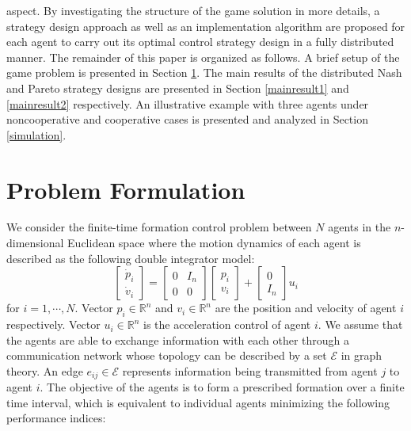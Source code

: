 \documentclass[letterpaper, 10 pt, conference,onecolumn]{ieeeconf}  %
\begin{document}
aspect. By investigating the structure of the game solution in more details, a strategy design approach as well as {an} implementation algorithm {are} proposed for each agent to carry out its optimal control strategy design in a fully distributed manner. The {remainder} of this paper is organized as follows. A brief setup of the game {problem} is presented in Section \ref{setup}. The main results of the distributed Nash and Pareto strategy {designs} are presented in Section \ref{mainresult1} and \ref{mainresult2} {respectively}. An illustrative example with three agents under noncooperative and cooperative cases is presented and analyzed in Section \ref{simulation}.


\section{Problem Formulation}\label{setup}
We consider the {finite-time} formation control problem between $N$ agents in the $n$-dimensional Euclidean space where the motion dynamics of each agent is described as the following double integrator model:
{\begin{equation}
\begin{bmatrix}
\dot{p}_i\\ \dot{v}_i
\end{bmatrix}=\begin{bmatrix}
0&I_n\\0&0
\end{bmatrix}\begin{bmatrix}
p_i\\
v_i\end{bmatrix}+\begin{bmatrix}
0\\ I_n
\end{bmatrix}u_i\label{systemxi}
\end{equation}}
for $i=1,\cdots,N$. {Vector $p_i\in\mathbb{R}^n$ and $v_i\in\mathbb{R}^n$ are the position and velocity of agent $i$ respectively.} Vector $u_i\in\mathbb{R}^{n}$ is the acceleration control of agent $i$. We assume that the agents are able to exchange information with each other through a communication network {whose topology can be described by a set $\mathcal{E}$ in graph theory. An edge $e_{ij}\in\mathcal{E}$ represents information being transmitted from agent $j$ to agent $i$}. The objective of the agents is to form a prescribed formation over a finite time interval, which is equivalent to individual agents minimizing the following performance indices:
\end{document}
